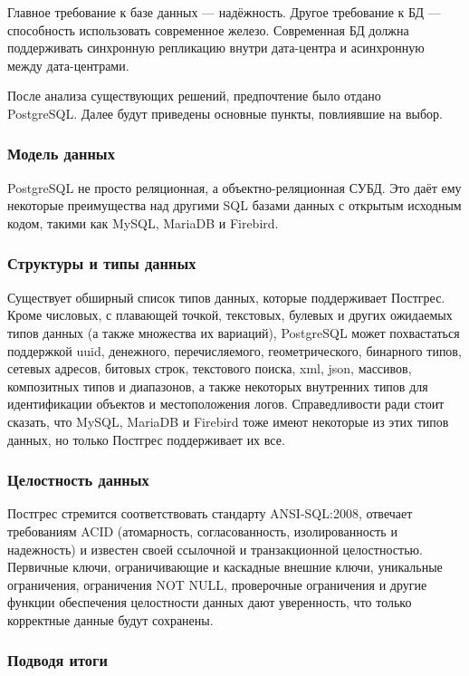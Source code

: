 Главное требование к базе данных — надёжность. Другое требование к БД — способность использовать современное железо.
Современная БД должна поддерживать синхронную репликацию внутри дата-центра и асинхронную между дата-центрами.

После анализа существующих решений, предпочтение было отдано \\
PostgreSQL. Далее будут приведены основные пункты, повлиявшие на выбор.

\subsubsection*{Модель данных}

PostgreSQL не просто реляционная, а объектно-реляционная СУБД. Это даёт ему некоторые преимущества над другими
SQL базами данных с открытым исходным кодом, такими как MySQL, MariaDB и Firebird.

\subsubsection*{Структуры и типы данных}

Существует обширный список типов данных, которые поддерживает Постгрес. Кроме числовых, с плавающей точкой, текстовых,
булевых и других ожидаемых типов данных (а также множества их вариаций), PostgreSQL может похвастаться поддержкой uuid,
денежного, перечисляемого, геометрического, бинарного типов, сетевых адресов, битовых строк, текстового поиска,
xml, json, массивов, композитных типов и диапазонов, а также некоторых внутренних типов для идентификации объектов и
местоположения логов. Справедливости ради стоит сказать, что MySQL, MariaDB и Firebird тоже имеют некоторые из этих
типов данных, но только Постгрес поддерживает их все.

\subsubsection*{Целостность данных}

Постгрес стремится соответствовать стандарту ANSI-SQL:2008, отвечает требованиям ACID (атомарность, согласованность,
изолированность и надежность) и известен своей ссылочной и транзакционной целостностью. Первичные ключи,
ограничивающие и каскадные внешние ключи, уникальные ограничения, ограничения NOT NULL, проверочные
ограничения и другие функции обеспечения целостности данных дают уверенность, что только корректные данные будут сохранены.

\subsubsection*{Подводя итоги}

